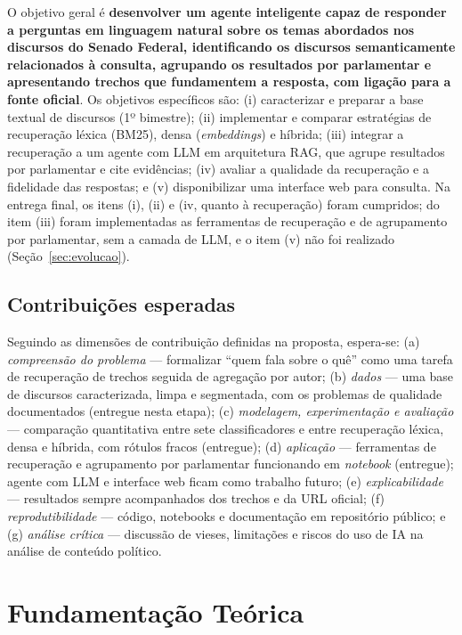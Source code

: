 \documentclass[12pt]{article}
\begin{document}
O objetivo geral é \textbf{desenvolver um agente inteligente capaz de responder a perguntas em
linguagem natural sobre os temas abordados nos discursos do Senado Federal, identificando os
discursos semanticamente relacionados à consulta, agrupando os resultados por parlamentar e
apresentando trechos que fundamentem a resposta, com ligação para a fonte oficial}. Os objetivos
específicos são:
(i) caracterizar e preparar a base textual de discursos (1º bimestre);
(ii) implementar e comparar estratégias de recuperação léxica (BM25), densa (\textit{embeddings})
e híbrida;
(iii) integrar a recuperação a um agente com LLM em arquitetura RAG, que agrupe resultados por
parlamentar e cite evidências;
(iv) avaliar a qualidade da recuperação e a fidelidade das respostas; e
(v) disponibilizar uma interface web para consulta. Na entrega final, os itens (i), (ii) e (iv,
quanto à recuperação) foram cumpridos; do item (iii) foram implementadas as ferramentas de
recuperação e de agrupamento por parlamentar, sem a camada de LLM, e o item (v) não foi
realizado (Seção~\ref{sec:evolucao}).

\subsection{Contribuições esperadas}

Seguindo as dimensões de contribuição definidas na proposta, espera-se:
(a) \emph{compreensão do problema} --- formalizar ``quem fala sobre o quê'' como uma tarefa de
recuperação de trechos seguida de agregação por autor;
(b) \emph{dados} --- uma base de discursos caracterizada, limpa e segmentada, com os problemas de
qualidade documentados (entregue nesta etapa);
(c) \emph{modelagem, experimentação e avaliação} --- comparação quantitativa entre sete
classificadores e entre recuperação léxica, densa e híbrida, com rótulos fracos (entregue);
(d) \emph{aplicação} --- ferramentas de recuperação e agrupamento por parlamentar funcionando em
\textit{notebook} (entregue); agente com LLM e interface web ficam como trabalho futuro;
(e) \emph{explicabilidade} --- resultados sempre acompanhados dos trechos e da URL oficial;
(f) \emph{reprodutibilidade} --- código, notebooks e documentação em repositório público; e
(g) \emph{análise crítica} --- discussão de vieses, limitações e riscos do uso de IA na análise de
conteúdo político.

\section{Fundamentação Teórica}
\end{document}
